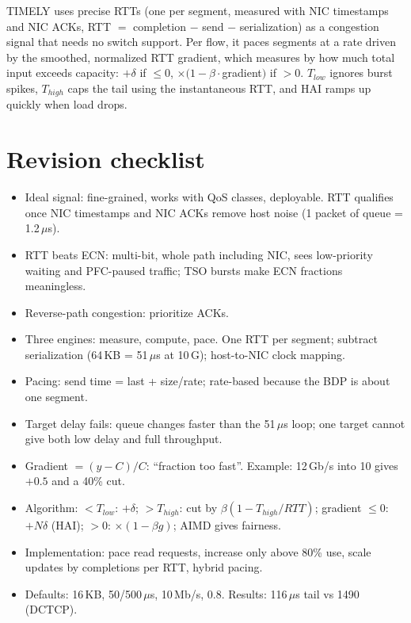 \begin{keybox}
TIMELY uses precise RTTs (one per segment, measured with NIC timestamps and NIC ACKs, RTT $=$ completion $-$ send $-$ serialization) as a
congestion signal that needs no switch support. Per flow, it paces segments at a rate driven by the smoothed, normalized RTT gradient, which
measures by how much total input exceeds capacity: $+\delta$ if $\le 0$, $\times(1 - \beta\cdot$gradient$)$ if $> 0$. $T_{low}$ ignores burst
spikes, $T_{high}$ caps the tail using the instantaneous RTT, and HAI ramps up quickly when load drops.
\end{keybox}

\section{Revision checklist}
\begin{itemize}
  \item Ideal signal: fine-grained, works with QoS classes, deployable. RTT qualifies once NIC timestamps and NIC ACKs remove host noise (1 packet of queue = 1.2\,$\mu$s).
  \item RTT beats ECN: multi-bit, whole path including NIC, sees low-priority waiting and PFC-paused traffic; TSO bursts make ECN fractions meaningless.
  \item Reverse-path congestion: prioritize ACKs.
  \item Three engines: measure, compute, pace. One RTT per segment; subtract serialization (64\,KB = 51\,$\mu$s at 10\,G); host-to-NIC clock mapping.
  \item Pacing: send time = last + size/rate; rate-based because the BDP is about one segment.
  \item Target delay fails: queue changes faster than the 51\,$\mu$s loop; one target cannot give both low delay and full throughput.
  \item Gradient $= (y - C)/C$: ``fraction too fast''. Example: 12\,Gb/s into 10 gives $+0.5$ and a 40\% cut.
  \item Algorithm: $< T_{low}$: $+\delta$; $> T_{high}$: cut by $\beta(1 - T_{high}/RTT)$; gradient $\le 0$: $+N\delta$ (HAI); $> 0$: $\times(1 - \beta g)$; AIMD gives fairness.
  \item Implementation: pace read requests, increase only above 80\% use, scale updates by completions per RTT, hybrid pacing.
  \item Defaults: 16\,KB, 50/500\,$\mu$s, 10\,Mb/s, 0.8. Results: 116\,$\mu$s tail vs 1490 (DCTCP).
\end{itemize}
